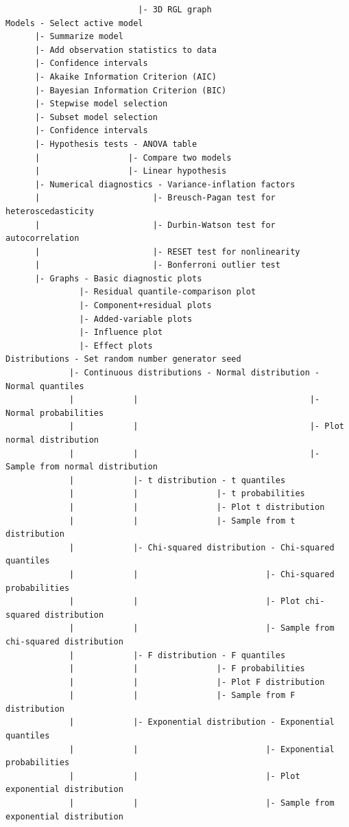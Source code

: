 \documentclass{article}%
\begin{document}
\begin{verbatim}
                           |- 3D RGL graph
Models - Select active model
      |- Summarize model
      |- Add observation statistics to data
      |- Confidence intervals
      |- Akaike Information Criterion (AIC)
      |- Bayesian Information Criterion (BIC)
      |- Stepwise model selection
      |- Subset model selection
      |- Confidence intervals
      |- Hypothesis tests - ANOVA table
      |                  |- Compare two models
      |                  |- Linear hypothesis
      |- Numerical diagnostics - Variance-inflation factors
      |                       |- Breusch-Pagan test for heteroscedasticity
      |                       |- Durbin-Watson test for autocorrelation
      |                       |- RESET test for nonlinearity
      |                       |- Bonferroni outlier test
      |- Graphs - Basic diagnostic plots
               |- Residual quantile-comparison plot
               |- Component+residual plots
               |- Added-variable plots
               |- Influence plot
               |- Effect plots
Distributions - Set random number generator seed
             |- Continuous distributions - Normal distribution - Normal quantiles
             |            |                                   |- Normal probabilities
             |            |                                   |- Plot normal distribution
             |            |                                   |- Sample from normal distribution
             |            |- t distribution - t quantiles
             |            |                |- t probabilities
             |            |                |- Plot t distribution
             |            |                |- Sample from t distribution
             |            |- Chi-squared distribution - Chi-squared quantiles
             |            |                          |- Chi-squared probabilities
             |            |                          |- Plot chi-squared distribution
             |            |                          |- Sample from chi-squared distribution
             |            |- F distribution - F quantiles
             |            |                |- F probabilities
             |            |                |- Plot F distribution
             |            |                |- Sample from F distribution
             |            |- Exponential distribution - Exponential quantiles
             |            |                          |- Exponential probabilities
             |            |                          |- Plot exponential distribution
             |            |                          |- Sample from exponential distribution

\end{verbatim}
\end{document}
